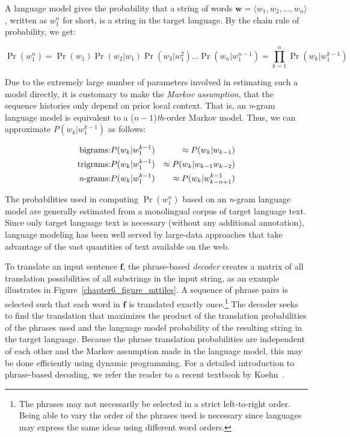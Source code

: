 A language model gives the probability that a string of words
$\textbf{w} = \langle w_1, w_2, \ldots , w_{n} \rangle$, written as
$w_{1}^{n}$ for short, is a string in the target language.  By the
chain rule of probability, we get:

\begin{equation}
\Pr(w_{1}^{n}) = \Pr(w_1) \Pr(w_2|w_1) \Pr(w_3|w_1^2) \ldots \Pr(w_n|w_1^{n-1}) = \prod_{k=1}^{n} \Pr(w_k|w_1^{k-1})
\end{equation}

\noindent Due to the extremely large number of parameters involved in
estimating such a model directly, it is customary to make the {\it
  Markov assumption}, that the sequence histories only depend on prior
local context.  That is, an {\it n}-gram language model is equivalent
to a ($n-1$){\it th}-order Markov model.  Thus, we can approximate
$P(w_k|w_1^{k-1})$ as follows:

\begin{eqnarray}
\textrm{bigrams:} & P(w_k|w_1^{k-1}) & \approx P(w_k|w_{k-1}) \\
\textrm{trigrams:} & P(w_k|w_1^{k-1}) & \approx P(w_k|w_{k-1} w_{k-2}) \\
\textrm{{\it n}-grams:} & P(w_k|w_1^{k-1}) & \approx  P(w_k|w_{k-n+1}^{k-1})
\end{eqnarray}

\noindent The probabilities used in computing $\Pr(w_{1}^{n})$ based
on an {\it n}-gram language model are generally estimated from a
monolingual corpus of target language text.  Since only target
language text is necessary (without any additional annotation),
language modeling has been well served by large-data approaches that
take advantage of the vast quantities of text available on the web.

To translate an input sentence $\textbf{f}$, the phrase-based
\emph{decoder} creates a matrix of all translation possibilities of
all substrings in the input string, as an example illustrates in
Figure~\ref{chapter6_figure_mttiles}.  A sequence of phrase pairs is
selected such that each word in $\textbf{f}$ is translated exactly
once.\footnote{The phrases may not necessarily be selected in a strict
  left-to-right order.  Being able to vary the order of the phrases
  used is necessary since languages may express the same ideas using
  different word orders.}  The decoder seeks to find the translation
that maximizes the product of the translation probabilities of the
phrases used and the language model probability of the resulting
string in the target language.  Because the phrase translation
probabilities are independent of each other and the Markov assumption
made in the language model, this may be done efficiently using dynamic
programming.  For a detailed introduction to phrase-based decoding, we
refer the reader to a recent textbook by Koehn~\cite{Koehn_2009}.

